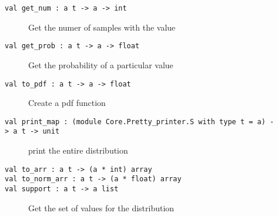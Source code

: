 \begin{description}
\item[{\protect\hyperlink{val-getux5fnum}{}\texttt{val\ get\_num\ :\ \textquotesingle{}a\ t\ -\textgreater{}\ \textquotesingle{}a\ -\textgreater{}\ int}}]
Get the numer of samples with the value
\end{description}

\begin{description}
\item[{\protect\hyperlink{val-getux5fprob}{}\texttt{val\ get\_prob\ :\ \textquotesingle{}a\ t\ -\textgreater{}\ \textquotesingle{}a\ -\textgreater{}\ float}}]
Get the probability of a particular value
\end{description}

\begin{description}
\item[{\protect\hyperlink{val-toux5fpdf}{}\texttt{val\ to\_pdf\ :\ \textquotesingle{}a\ t\ -\textgreater{}\ \textquotesingle{}a\ -\textgreater{}\ float}}]
Create a pdf function
\end{description}

\begin{description}
\item[{\protect\hyperlink{val-printux5fmap}{}\texttt{val\ print\_map\ :\ (module\ Core.Pretty\_printer.S\ with\ type\ t\ =\ \textquotesingle{}a)\ -\textgreater{}\ \textquotesingle{}a\ t\ -\textgreater{}\ unit}}]
print the entire distribution
\end{description}

\begin{description}
\item[{\protect\hyperlink{val-toux5farr}{}\texttt{val\ to\_arr\ :\ \textquotesingle{}a\ t\ -\textgreater{}\ (\textquotesingle{}a\ *\ int)\ array}\\
\protect\hyperlink{val-toux5fnormux5farr}{}\texttt{val\ to\_norm\_arr\ :\ \textquotesingle{}a\ t\ -\textgreater{}\ (\textquotesingle{}a\ *\ float)\ array}\\
\protect\hyperlink{val-support}{}\texttt{val\ support\ :\ \textquotesingle{}a\ t\ -\textgreater{}\ \textquotesingle{}a\ list}}]
Get the set of values for the distribution
\end{description}
